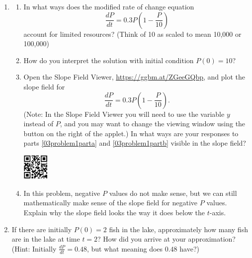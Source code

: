 \begin{enumerate}
\item	\label{02problem1}
\begin{enumerate}
\item In what ways does the modified rate of change equation \label{03problem1parta}
\[ \frac{dP}{dt}=0.3P\left(1-\frac{P}{10}\right) \] account for limited resources? (Think of 10 as scaled to mean 10,000 or 100,000) 
\vfill
\item	How do you interpret the solution with initial condition $P(0) = 10$? \label{03problem1partb}
\vfill
\item	Open the Slope Field Viewer, \href{https://ggbm.at/ZGeeGQbp}{\underline{https://ggbm.at/ZGeeGQbp}},
and plot the slope field for \[ \frac{dP}{dt}=0.3P\left(1-\frac{P}{10}\right). \]
(Note: In the Slope Field Viewer you will need to use the variable $y$ instead of $P$, and you may want to change the viewing window using the button on the right of the applet.) In what ways are your responses to parts \ref{03problem1parta} and \ref{03problem1partb} visible in the slope field? \label{03problem1partc}

\vspace{-1in}\hspace{-0.75in}\includegraphics[width=0.5in]{03/03SlopeFieldViewerQR.png}
\vfill

\item	In this problem, negative $P$ values do not make sense, but we can still mathematically make sense of the slope field for negative $P$ values. Explain why the slope field looks the way it does below the $t$-axis. \label{03problem1partd}
\vfill
\end{enumerate}

\item If there are initially $P(0)=2$ fish in the lake, approximately how many fish are in the lake at time $t=2$?  How did you arrive at your approximation? (Hint: Initially $\frac{dP}{dt} = 0.48$, but what meaning does $0.48$ have?) \label{03problem3}
\vfill
\end{enumerate}

\clearpage


